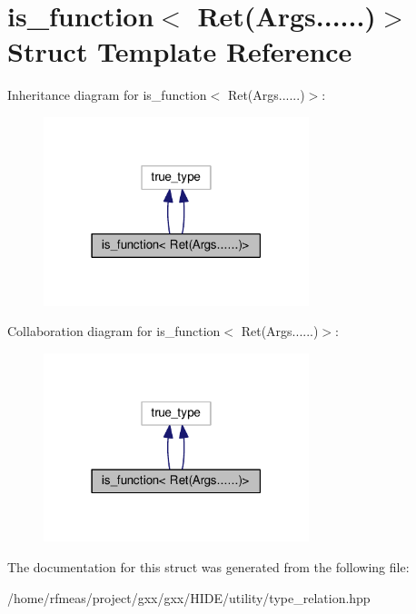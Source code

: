\hypertarget{structis__function_3_01Ret_07Args_8_8_8_8_8_8_08_4}{}\section{is\+\_\+function$<$ Ret(Args......)$>$ Struct Template Reference}
\label{structis__function_3_01Ret_07Args_8_8_8_8_8_8_08_4}


Inheritance diagram for is\+\_\+function$<$ Ret(Args......)$>$\+:
\nopagebreak
\begin{figure}[H]
\begin{center}
\leavevmode
\includegraphics[width=219pt]{structis__function_3_01Ret_07Args_8_8_8_8_8_8_08_4__inherit__graph}
\end{center}
\end{figure}


Collaboration diagram for is\+\_\+function$<$ Ret(Args......)$>$\+:
\nopagebreak
\begin{figure}[H]
\begin{center}
\leavevmode
\includegraphics[width=219pt]{structis__function_3_01Ret_07Args_8_8_8_8_8_8_08_4__coll__graph}
\end{center}
\end{figure}


The documentation for this struct was generated from the following file\+:\begin{DoxyCompactItemize}
\item 
/home/rfmeas/project/gxx/gxx/\+H\+I\+D\+E/utility/type\+\_\+relation.\+hpp\end{DoxyCompactItemize}
